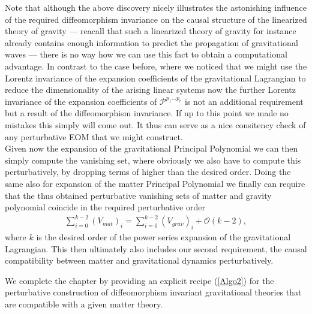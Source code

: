 \documentclass[a4paper,12pt, DIV=14, BCOR=5mm, twoside, headsepline, numbers=noenddot]{scrbook}
\begin{document}
Note that although the above discovery nicely illustrates the astonishing influence of the required diffeomorphism invariance on the causal structure of the linearized theory of gravity --- reacall that such a linearized theory of gravity for instance already contains enough information to predict the propagation of gravitational waves --- there is no way how we can use this fact to obtain a computational advantage. In contrast to the case before, where we noticed that we might use the Lorentz invariance of the expansion coefficients of the gravitational Lagrangian to reduce the dimensionality of the arising linear systems now the further Lorentz invariance of the expansion coefficients of $\mathcal{P}^{p_1...p_r}$ is not an additional requirement but a result of the diffeomorphism invariance. If up to this point we made no mistakes this simply will come out. It thus can serve as a nice consitency check of any perturbative EOM that we might construct.\\

Given now the expansion of the gravitational Principal Polynomial we can then simply compute the vanishing set, where obviously we also have to compute this perturbatively, by dropping terms of higher than the desired order. Doing the same also for expansion of the matter Principal Polynomial we finally can require that the thus obtained perturbative vanishing sets of matter and gravity polynomial coincide in the required perturbative order 
\begin{align}
    \sum_{i=0}^{k-2} (V_{mat})_i = \sum _{i=0}^{k-2}(V_{grav})_i + \mathcal{O}(k-2),
\end{align}
where $k$ is the desired order of the power series expansion of the gravitational Lagrangian. This then ultimately also includes our second requirement, the causal compatibility between matter and gravitational dynamics perturbatively. 

We complete the chapter by providing an explicit recipe (\ref{Algo2}) for the perturbative construction of diffeomorphism invariant gravitational theories that are compatible with a given matter theory.\\
\end{document}
